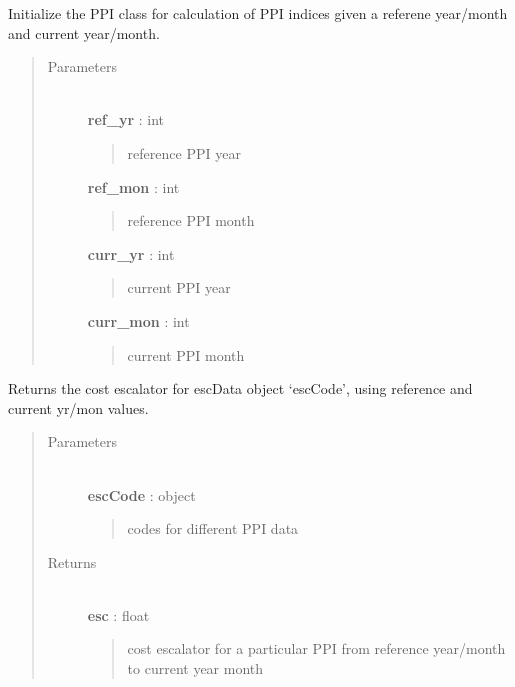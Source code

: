 \documentclass[letterpaper,10pt,openany,oneside]{sphinxmanual}
\begin{document}
\begin{fulllineitems}
\label{documentation:turbine_costSE.src.csmPPI.PPI}
Initialize the PPI class for calculation of PPI indices given a referene year/month and current year/month.
\begin{quote}\begin{description}
\item[{Parameters }] \leavevmode\\
\textbf{ref\_yr} : int
\begin{quote}

reference PPI year
\end{quote}

\textbf{ref\_mon} : int
\begin{quote}

reference PPI month
\end{quote}

\textbf{curr\_yr} : int
\begin{quote}

current PPI year
\end{quote}

\textbf{curr\_mon} : int
\begin{quote}

current PPI month
\end{quote}

\end{description}\end{quote}

\begin{fulllineitems}
\label{documentation:turbine_costSE.src.csmPPI.PPI.compute}
Returns the cost escalator for escData object `escCode', using reference and current yr/mon values.
\begin{quote}\begin{description}
\item[{Parameters }] \leavevmode\\
\textbf{escCode} : object
\begin{quote}

codes for different PPI data
\end{quote}

\item[{Returns }] \leavevmode\\
\textbf{esc} : float
\begin{quote}

cost escalator for a particular PPI from reference year/month to current year month
\end{quote}

\end{description}\end{quote}

\end{fulllineitems}


\end{fulllineitems}
\end{document}
